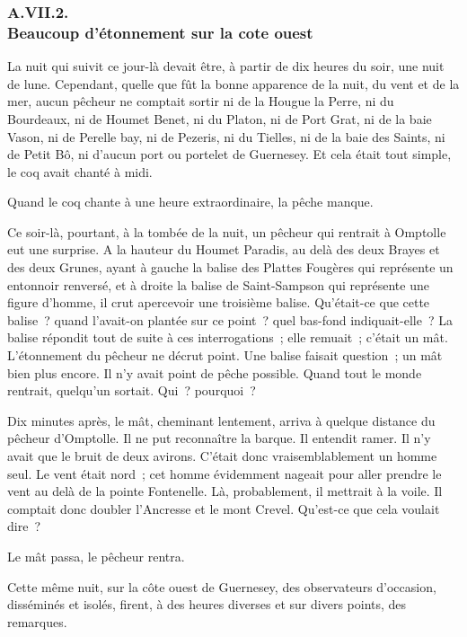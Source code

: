\documentclass[french,twoside]{book} %
\begin{document}
 \subsubsection[{A.VII.2. Beaucoup d’étonnement sur la cote ouest}]{A.VII.2. \\
Beaucoup d’étonnement sur la cote ouest}
\noindent La nuit qui suivit ce jour-là devait être, à partir de dix heures du soir, une nuit de lune. Cependant, quelle que fût la bonne apparence de la nuit, du vent et de la mer, aucun pêcheur ne comptait sortir ni de la Hougue la Perre, ni du Bourdeaux, ni de Houmet Benet, ni du Platon, ni de Port Grat, ni de la baie Vason, ni de Perelle bay, ni de Pezeris, ni du Tielles, ni de la baie des Saints, ni de Petit Bô, ni d’aucun port ou portelet de Guernesey. Et cela était tout simple, le coq avait chanté à midi.\par
Quand le coq chante à une heure extraordinaire, la pêche manque.\par
Ce soir-là, pourtant, à la tombée de la nuit, un pêcheur qui rentrait à Omptolle eut une surprise. A la hauteur du Houmet Paradis, au delà des deux Brayes et des deux Grunes, ayant à gauche la balise des Plattes Fougères qui représente un entonnoir renversé, et à droite la balise de Saint-Sampson qui représente  une figure d’homme, il crut apercevoir une troisième balise. Qu’était-ce que cette balise ? quand l’avait-on plantée sur ce point ? quel bas-fond indiquait-elle ? La balise répondit tout de suite à ces interrogations ; elle remuait ; c’était un mât. L’étonnement du pêcheur ne décrut point. Une balise faisait question ; un mât bien plus encore. Il n’y avait point de pêche possible. Quand tout le monde rentrait, quelqu’un sortait. Qui ? pourquoi ?\par
Dix minutes après, le mât, cheminant lentement, arriva à quelque distance du pêcheur d’Omptolle. Il ne put reconnaître la barque. Il entendit ramer. Il n’y avait que le bruit de deux avirons. C’était donc vraisemblablement un homme seul. Le vent était nord ; cet homme évidemment nageait pour aller prendre le vent au delà de la pointe Fontenelle. Là, probablement, il mettrait à la voile. Il comptait donc doubler l’Ancresse et le mont Crevel. Qu’est-ce que cela voulait dire ?\par
Le mât passa, le pêcheur rentra.\par
Cette même nuit, sur la côte ouest de Guernesey, des observateurs d’occasion, disséminés et isolés, firent, à des heures diverses et sur divers points, des remarques.\par
\end{document}
